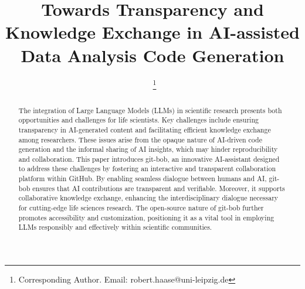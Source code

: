 \documentclass{ecai}
\begin{document}

\begin{frontmatter}




\title{Towards Transparency and Knowledge Exchange in AI-assisted Data Analysis Code Generation}


\author[A,B]{~\thanks{Corresponding Author. Email: robert.haase@uni-leipzig.de}}

\address[A]{Data Science Center, Leipzig University, Humboldtstra{\ss}e 25, 04105 Leipzig, Germany}
\address[B]{Center for Scalable Data Analytics and Artificial Intelligence (ScaDS.AI) Dresden / Leipzig}


\begin{abstract}

The integration of Large Language Models (LLMs) in scientific research presents both opportunities and challenges for life scientists. Key challenges include ensuring transparency in AI-generated content and facilitating efficient knowledge exchange among researchers. These issues arise from the opaque nature of AI-driven code generation and the informal sharing of AI insights, which may hinder reproducibility and collaboration. This paper introduces git-bob, an innovative AI-assistant designed to address these challenges by fostering an interactive and transparent collaboration platform within GitHub. By enabling seamless dialogue between humans and AI, git-bob ensures that AI contributions are transparent and verifiable. Moreover, it supports collaborative knowledge exchange, enhancing the interdisciplinary dialogue necessary for cutting-edge life sciences research. The open-source nature of git-bob further promotes accessibility and customization, positioning it as a vital tool in employing LLMs responsibly and effectively within scientific communities.

\end{abstract}

\end{frontmatter}
\end{document}
